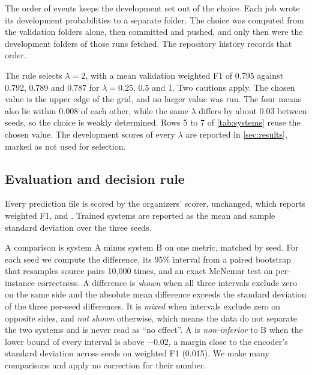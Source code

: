 The order of events keeps the development set out of the choice. Each job wrote its development probabilities to a separate folder. The choice was computed from the validation folders alone, then committed and pushed, and only then were the development folders of those runs fetched. The repository history records that order.

The rule selects $\lambda = 2$, with a mean validation weighted F1 of 0.795 against 0.792, 0.789 and 0.787 for $\lambda = 0.25$, 0.5 and 1. %
Two cautions apply. The chosen value is the upper edge of the grid, and no larger value was run. The four means also lie within 0.008 of each other, while the same $\lambda$ differs by about 0.03 between seeds, so the choice is weakly determined. Rows 5 to 7 of \cref{tab:systems} reuse the chosen value. The development scores of every $\lambda$ are reported in \cref{sec:results}, marked as not used for selection.

\subsection{Evaluation and decision rule}
\label{sec:setup-evaluation}

Every prediction file is scored by the organizers' scorer, unchanged, which reports weighted F1, \SoftCons{} and \HardCons{}. Trained systems are reported as the mean and sample standard deviation over the three seeds.

A comparison is system A minus system B on one metric, matched by seed. For each seed we compute the difference, its 95\% interval from a paired bootstrap that resamples source pairs 10,000 times, and an exact McNemar test on per-instance correctness. A difference is \emph{shown} when all three intervals exclude zero on the same side and the absolute mean difference exceeds the standard deviation of the three per-seed differences. It is \emph{mixed} when intervals exclude zero on opposite sides, and \emph{not shown} otherwise, which means the data do not separate the two systems and is never read as ``no effect''. A is \emph{non-inferior} to B when the lower bound of every interval is above $-0.02$, a margin close to the encoder's standard deviation across seeds on weighted F1 (0.015). %
We make many comparisons and apply no correction for their number.
